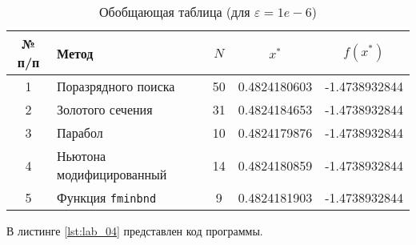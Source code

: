 \documentclass{bmstu}
\begin{document}
\begin{table}[H]
    \centering
	\caption{Обобщающая таблица (для $\varepsilon = 1e-6$)}
    \label{tbl:task}
	\begin{tabular}{|c|l|c|c|c|}
        \hline
        № п/п & Метод & $N$ & $x^*$ & $f(x^*)$ \\ \hline
        1 & Поразрядного поиска & 50 & 0.4824180603 & -1.4738932844 \\ \hline
        2 & Золотого сечения & 31 & 0.4824184653 & -1.4738932844 \\ \hline
        3 & Парабол & 10 & 0.4824179876 & -1.4738932844 \\ \hline
        4 & Ньютона модифицированный & 14 & 0.4824180859 & -1.4738932844 \\ \hline
        5 & Функция \texttt{fminbnd} & 9 & 0.4824181903 & -1.4738932844 \\ \hline
    \end{tabular}
\end{table}

В листинге \ref{lst:lab_04} представлен код программы.

\end{document}

